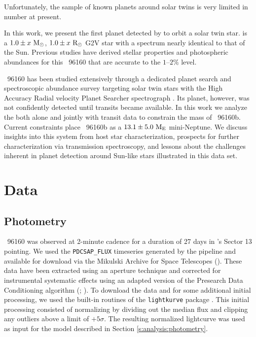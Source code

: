 \documentclass[modern]{aastex62}
\newcommand{\hoststar}{\acronym{HIP}\ 96160\xspace}
\newcommand{\plname}{\acronym{HIP}\ 96160b\xspace}
\newcommand{\plmass}{$13.1 \pm 5.0\ \mearth$\xspace}
\newcommand{\stmass}{$1.0 \pm x\ \msun$\xspace}
\newcommand{\stradius}{$1.0 \pm x\ \rsun$\xspace}
\begin{document}
Unfortunately, the sample of known planets around solar twins is very limited in number at present. 



In this work, we present the first planet detected by \TESS to orbit a solar twin star. 
\object[HIP96160]{\hoststar} is a \stmass, \stradius G2V star with a spectrum nearly identical to that of the Sun. 
Previous studies have derived stellar properties and photospheric abundances for this \hoststar that are accurate to the $1\text{--}2\%$ level.

\hoststar has been studied extensively through a dedicated \RV planet search and spectroscopic abundance survey targeting solar twin stars with the High Accuracy Radial velocity Planet Searcher spectrograph \citep[\HARPS][]{mayor03}. 
Its planet, however, was not confidently detected until \TESS transits became available. 
In this work we analyze the \RVs both alone and jointly with \TESS transit data to constrain the mass of \plname. 
Current constraints place \plname as a \plmass mini-Neptune. 
We discuss insights into this system from host star characterization, prospects for further characterization via transmission spectroscopy, and lessons about the challenges inherent in \RV planet detection around Sun-like stars illustrated in this data set.

\section{Data}
\label{s:data}

\subsection{Photometry}
\label{s:data:tess}

\hoststar was observed at 2-minute cadence for a duration of 27 days in \TESS's Sector 13 pointing. 
We used the \texttt{PDCSAP\_FLUX} timeseries generated by the \TESS pipeline and available for download via the Mikulski Archive for Space Telescopes (). 
These data have been extracted using an aperture technique and corrected for instrumental systematic effects using an adapted version of the \kepler Presearch Data Conditioning algorithm (; ). 
To download the data and for some additional initial processing, we used the built-in routines of the \texttt{lightkurve} package . 
This initial processing consisted of normalizing by dividing out the median flux and clipping any outliers above a limit of $+5\sigma$. 
The resulting normalized lightcurve was used as input for the model described in Section \ref{s:analysis:photometry}.
\end{document}
